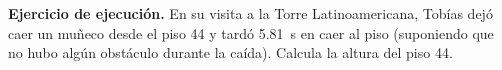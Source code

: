 \documentclass[12pt, letter]{exam}
\begin{document}
\begin{questions}
    \question \label{Ejercicio_05} \textbf{Ejercicio de ejecución. } En su visita a la Torre Latinoamericana, Tobías dejó caer un muñeco desde el piso \num{44} y tardó \SI{5.81}{\second} en caer al piso (suponiendo que no hubo algún obstáculo durante la caída). Calcula la altura del piso \num{44}.

\end{questions}
\end{document}
